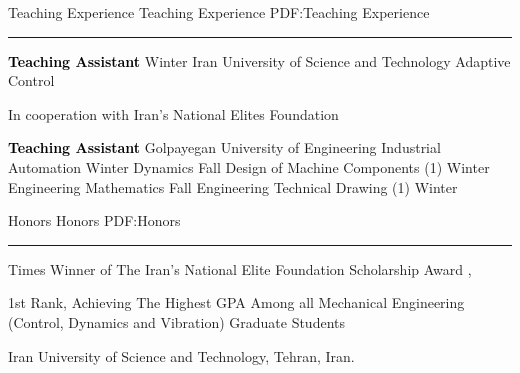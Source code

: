 \documentclass[letterpaper,MMMyyyy]{ResumeTemplate}
\begin{document}
\begin{Body}
\Section
{Teaching Experience}
{Teaching Experience}
{PDF:Teaching Experience}
\textcolor{Forestg}{\vspace{0.05cm}\hrule height 0.1cm}\BigGap


\Entry
\textcolor{black}{\textbf{Teaching Assistant}}
\hfill
\textcolor{OrangeY}{Winter }
\Gap
\BulletItem
Iran University of Science and Technology
\newline
Adaptive Control
\begin{Detail}
	\qquad In cooperation with Iran's National Elites Foundation
\end{Detail}



\Gap
\Entry
\textcolor{black}{\textbf{Teaching Assistant}}
\Gap
\BulletItem
Golpayegan University of Engineering
\newline
Industrial Automation
\hfill
\textcolor{OrangeY}{Winter }
\newline
Dynamics
\hfill
\textcolor{OrangeY}{Fall }
\newline
Design of Machine Components (1)
\hfill
\textcolor{OrangeY}{Winter }
\newline
Engineering Mathematics 
\hfill
\textcolor{OrangeY}{Fall }
\newline
Engineering Technical Drawing (1) 
\hfill
\textcolor{OrangeY}{Winter }

\Section
{Honors}
{Honors}
{PDF:Honors}
\textcolor{Forestg}{\vspace{0.05cm}\hrule height 0.1cm}\BigGap
\Gap
{} Times Winner of The Iran's National Elite Foundation Scholarship Award
 \hfill
\textcolor{OrangeY}{, }
\vspace{5pt}

\Gap
\vspace{5pt}
\BulletItem
1st Rank, Achieving The Highest GPA Among all Mechanical Engineering (Control, Dynamics and Vibration) Graduate Students
\hfill
\textcolor{OrangeY}{}
\begin{Detail}
	\Item
	Iran University of Science and Technology, Tehran, Iran.
\end{Detail}


\end{Body}
\end{document}
